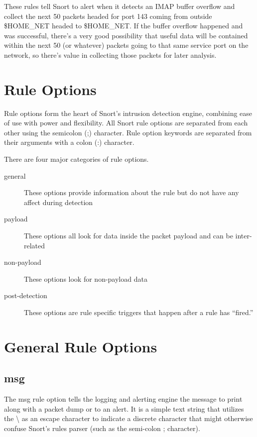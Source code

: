 \documentclass[english]{report}
\begin{document}
These rules tell Snort to alert when it detects an IMAP buffer overflow and
collect the next 50 packets headed for port 143 coming from outside \$HOME\_NET
headed to \$HOME\_NET. If the buffer overflow happened and was successful,
there's a very good possibility that useful data will be contained within the
next 50 (or whatever) packets going to that same service port on the network,
so there's value in collecting those packets for later analysis.

\section{Rule Options}

Rule options form the heart of Snort's intrusion detection engine, combining
ease of use with power and flexibility. All Snort rule options are separated
from each other using the semicolon (;) character. Rule option keywords are
separated from their arguments with a colon (:) character. 

There are four major categories of rule options.  

\begin{description}

\item [general] These options provide information about the rule but do not
have any affect during detection 

\item [payload] These options all look for data inside the packet payload and
can be inter-related

\item [non-payload] These options look for non-payload data

\item [post-detection] These options are rule specific triggers that happen
after a rule has ``fired.''

\end{description}

\section{General Rule Options}

\subsection{msg}

The msg rule option tells the logging and alerting engine the message to print
along with a packet dump or to an alert. It is a simple text string that
utilizes the \textbackslash{} as an escape character to indicate a discrete
character that might otherwise confuse Snort's rules parser (such as the
semi-colon ; character).
\end{document}
